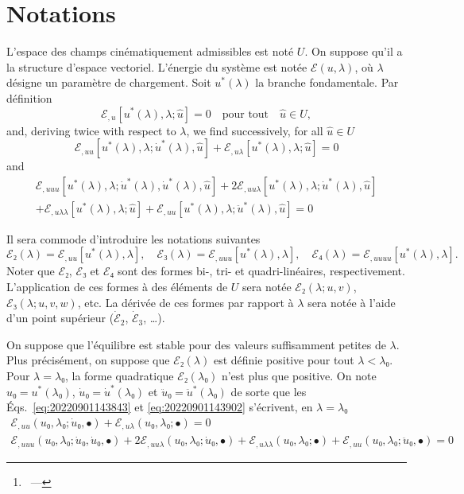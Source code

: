 \documentclass[12pt, final]{scrartcl}
\theoremstyle{definition}
\newcommand{\E}{\mathcal E}
\begin{document}
\title{\sbtitle}
\author{\sbauthor\thanks{\sbaddress~--- \sbemail}}
\maketitle

\section{Notations}

L'espace des champs cinématiquement admissibles est noté $U$. On suppose qu'il
a la structure d'espace vectoriel. L'énergie du système est notée $\E(u, λ)$,
où $λ$ désigne un paramètre de chargement. Soit $u^{\ast}(λ)$ la branche
fondamentale. Par définition
\begin{equation}
  \E_{,u}[u^{\ast}(λ), λ; \hat{u}]=0 \quad \text{pour tout} \quad \hat{u}∈U,
\end{equation}
and, deriving twice with respect to $λ$, we find successively, for all $\hat{u} ∈ U$
\begin{equation}
  \label{eq:20220901143843}
  \E_{,uu}[u^\ast(λ), λ; \dot{u}^\ast(λ), \hat{u}] + \E_{,uλ}[u^\ast(λ), λ; \hat{u}] = 0
\end{equation}
and
\begin{multline}
  \label{eq:20220901143902}
  \E_{,uuu}[u^\ast(λ), λ; \dot{u}^\ast(λ), \dot{u}^\ast(λ), \hat{u}] + 2\E_{,uuλ}[u^\ast(λ), λ; \dot{u}^\ast(λ), \hat{u}]\\
  + \E_{,uλλ}[u^\ast(λ), λ; \hat{u}] + \E_{,uu}[u^\ast(λ), λ; \ddot{u}^\ast(λ), \hat{u}] = 0
\end{multline}





Il sera commode d'introduire les notations suivantes
\begin{equation}
  \E₂(λ) = \E_{,uu}[u^{\ast}(λ), λ], \quad \E₃(λ) = \E_{,uuu}[u^{\ast}(λ), λ], \quad \E₄(λ) = \E_{,uuuu} [u^{\ast}(λ), λ].
\end{equation}
Noter que $\E₂$, $\E₃$ et $\E₄$ sont des formes bi-, tri- et
quadri-linéaires, respectivement. L'application de ces formes à des éléments de
$U$ sera notée $\E₂(λ; u, v)$, $\E₃(λ; u, v, w)$, etc. La dérivée de ces
formes par rapport à $λ$ sera notée à l'aide d'un point supérieur
($\dot{\E}_2$, $\dot{\E}_3$, \dots).

On suppose que l'équilibre est stable pour des valeurs suffisamment petites de
$λ$. Plus précisément, on suppose que $\E₂(λ)$ est définie positive pour tout
$λ < λ₀$. Pour $λ = λ₀$, la forme quadratique $\E₂(λ₀)$ n'est plus que
positive. On note $u₀ = u^{\ast}(λ₀)$, $\dot{u}₀ = \dot{u}^\ast(λ₀)$ et
$\ddot{u}₀ = \ddot{u}^\ast(λ₀)$ de sorte que les
Éqs.~\eqref{eq:20220901143843} et \eqref{eq:20220901143902} s'écrivent, en
$λ = λ₀$
\begin{gather}
  \label{eq:20220901144331}
  \E_{,uu}(u₀, λ₀; \dot{u}₀, \bullet) + \E_{,uλ}(u₀, λ₀; \bullet) = 0\\
  \label{eq:20220901144335}
  \E_{,uuu}(u₀, λ₀; \dot{u}₀, \dot{u}₀, \bullet) + 2\E_{,uuλ}(u₀, λ₀; \dot{u}₀, \bullet) + \E_{,uλλ}(u₀, λ₀; \bullet) + \E_{,uu}(u₀, λ₀; \ddot{u}₀, \bullet) = 0
\end{gather}
\end{document}
